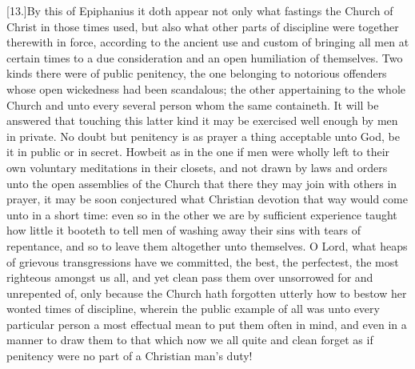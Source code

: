 [13.]By this of Epiphanius it doth appear not only what fastings the Church of Christ in those times used, but also what other parts of discipline were together therewith in force, according to the ancient use and custom of bringing all men at certain times to a due consideration and an open humiliation of themselves. Two kinds there were of public penitency, the one belonging to notorious offenders whose open wickedness had been scandalous; the other appertaining to the whole Church and unto every several person whom the same containeth. It will be answered that touching this latter kind it may be exercised well enough by men in private. No doubt but penitency is as prayer a thing acceptable unto God, be it in public or in secret. Howbeit as in the one if men were wholly left to their own voluntary meditations in their closets, and not drawn by laws and orders unto the open assemblies of the Church that there they may join with others in prayer, it may be soon conjectured what Christian devotion that way would come unto in a short time: even so in the other we are by sufficient experience taught how little it booteth to tell men of washing away their sins with tears of repentance, and so to leave them altogether unto themselves. O Lord, what heaps of grievous transgressions have we committed, the best, the perfectest, the most righteous amongst  us all, and yet clean pass them over unsorrowed for and unrepented of,
 only because the Church hath forgotten utterly how to bestow her wonted times of discipline, wherein the public example of all was unto every particular person a most effectual mean to put them often in mind, and even in a manner to draw them to that which now we all quite and clean forget as if penitency were no part of a Christian man’s duty!

